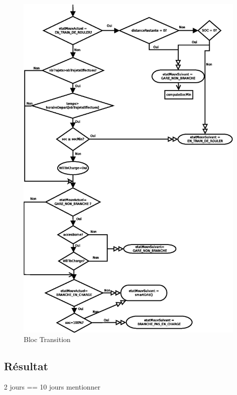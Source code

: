 			\begin{figure}[h]
				\centering
				\caption{Bloc Transition \label{fig.flowTransition}}
				\includegraphics[height=0.9\textheight]{fig/flowTransition.eps}
			\end{figure}
			
		
		
		\clearpage
	\subsection{Résultat}

2 jours == 10 jours mentionner